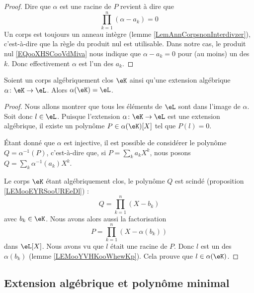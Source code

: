 \begin{proof}
	Dire que \( \alpha\) est une racine de \( P\) revient à dire que
	\begin{equation}        \label{EQooXHSCooVdMiva}
		\prod_{k=1}^n(\alpha-a_k)=0
	\end{equation}
	Un corps est toujours un anneau intègre (lemme \ref{LemAnnCorpsnonInterdivzer}), c'est-à-dire que la règle du produit nul est utilisable. Dans notre cas, le produit nul \eqref{EQooXHSCooVdMiva} nous indique que \( \alpha-a_k=0\) pour (au moins) un des \( k\). Donc effectivement \( \alpha\) est l'un des \( a_k\).
\end{proof}

\begin{lemma}
	Soient un corps algébriquement clos \( \eK\) ainsi qu'une extension algébrique \( \alpha\colon \eK\to \eL\). Alors \( \alpha(\eK)=\eL\).
\end{lemma}

\begin{proof}
	Nous allons montrer que tous les éléments de \( \eL\) sont dans l'image de \( \alpha\). Soit donc \( l\in \eL\). Puisque l'extension \( \alpha\colon \eK\to \eL\) est une extension algébrique, il existe un polynôme \( P\in \alpha(\eK)[X]\) tel que \( P(l)=0\).

	Étant donné que \( \alpha\) est injective, il est possible de considérer le polynôme \( Q=\alpha^{-1}(P)\), c'est-à-dire que, si \( P=\sum_ka_kX^k\), nous posons \( Q=\sum_k\alpha^{-1}(a_k)X^k\).

	Le corps \( \eK\) étant algébriquement clos, le polynôme \( Q\) est scindé (proposition \ref{LEMooEYRSooUREeDl}) :
	\begin{equation}
		Q=\prod_{k=1}^n(X-b_k)
	\end{equation}
	avec \( b_k\in \eK\). Nous avons alors aussi la factorisation
	\begin{equation}
		P=\prod_{k=1}^n(X-\alpha(b_k))
	\end{equation}
	dans \( \eL[X]\). Nous avons vu que \( l\) était une racine de \( P\). Donc \( l\) est un des \( \alpha(b_k)\) (lemme \ref{LEMooYVHKooWhewKp}). Cela prouve que \( l\in \alpha(\eK)\).
\end{proof}

\subsection{Extension algébrique et polynôme minimal}

